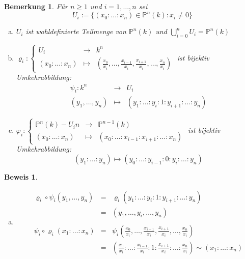 \documentclass[a4paper,12pt]{report}
\theoremstyle{break}
\newtheorem{Bem}[Def]{Bemerkung}
\theoremstyle{nonumberbreak}
\newtheorem{Bew}{Beweis}
\theoremstyle{nonumberplain}
\newcommand{\IP}{\mathbb{P}}%
\begin{document}
\begin{Bem}
F\"ur $n\ge1$ und $i=1,\dots ,n$ sei
	\[U_i:=\{ (x_0:\ldots :x_n)\in \IP^n(k):x_i\not=0\}\]
\begin{enumerate}[a)]
\item
	$U_i$ ist wohldefinierte Teilmenge von $\IP^n(k)$ und $\bigcup\limits_{i=0}^n U_i=\IP^n(k)$

\item
	$\varrho_i: \left\{ \begin{array}{rcl}
		U_i &\to& k^n\\
		(x_0:\ldots :x_n) &\mapsto& (\frac{x_0}{x_i}, \dots ,\frac{x_{i-1}}{x_i}, \frac{x_{i+1}}{x_i}, \dots , \frac{x_n}{x_i})
	\end{array} \right.$ ist bijektiv\\
	Umkehrabbildung:
		\[\begin{array}{rcl} 
			\psi_i:k^n &\to& U_i\\
			(y_1,\dots , y_n) &\mapsto& (y_1:\ldots: y_i :1:y_{i+1}:\ldots:y_n)
		\end{array}\]
		
\item
	$\varphi_i: \left\{ \begin{array}{rcl}
		\IP^n(k)-U_in &\to& \IP^{n-1}(k)\\
		(x_0:\ldots :x_n) &\mapsto& (x_0: \ldots: x_{i-1}: x_{i+1}: \ldots: x_n)
	\end{array} \right.$ ist bijektiv\\
	Umkehrabbildung:
		\[ (y_1: \ldots: y_n) \mapsto (y_0:\ldots:y_{i-1}:0:y_i:\ldots:y_n)\]
\end{enumerate}\end{Bem}

\begin{Bew}\begin{enumerate}[a)]\item[b)]
\[\begin{array}{rcl}
	\varrho_i\circ\psi_i(y_1,\dots ,y_n) &=&\varrho_i(y_1:\ldots:y_i:1:y_{i+1}:\ldots:y_n )\\
	&=& (y_1,\dots ,y_i,\dots ,y_n)\\ &&\\
	\psi_i\circ\varrho_i(x_1:\ldots:x_n)  &=& \psi_i(\frac{x_0}{x_i},\dots ,\frac{x_{i-1}}{x_i},\frac{x_{i+1}}{x_i},\dots ,\frac{x_n}{x_i})\\
	&=& (\frac{x_0}{x_i}:\ldots :\frac{x_{i-1}}{x_i}:1:\frac{x_{i+1}}{x_i}:\ldots :\frac{x_n}{x_i})\sim(x_1:\ldots:x_n )
\end{array}\]
\end{enumerate}\end{Bew}
\end{document}

